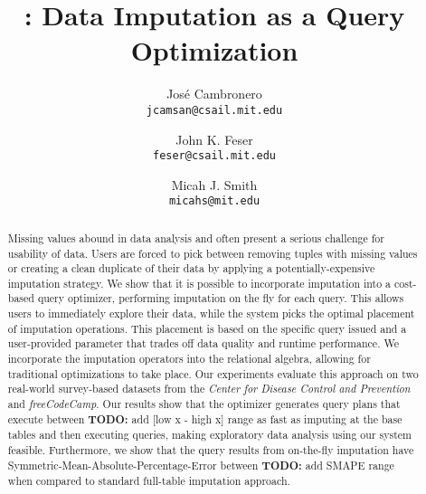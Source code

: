 \documentclass{vldb}
\title{\ProjectName{}: Data Imputation as a Query Optimization}
\author{
  Jos\'e Cambronero \\
  \texttt{jcamsan@csail.mit.edu}
  \and
  John K. Feser \\
  \texttt{feser@csail.mit.edu}
  \and
  Micah J. Smith \\
  \texttt{micahs@mit.edu}}
\newcommand{\todo}[1]{{\color{red}\textbf{TODO:} #1}}
\begin{document}
\maketitle

\begin{abstract}
Missing values abound in data analysis and often present a serious challenge for usability of data. Users
are forced to pick between removing tuples with missing values or creating a clean duplicate of their data
by  applying a potentially-expensive imputation strategy. We show that it is possible
to incorporate imputation into a cost-based query optimizer, performing imputation on the fly
for each query. This allows users to immediately explore
their data, while the system picks the optimal placement of imputation operations. This placement is based
on the specific query issued and a user-provided parameter that trades off data
quality and runtime performance. We incorporate the imputation operators into the relational algebra, allowing
for traditional optimizations to take place. Our experiments evaluate this approach on two real-world survey-based datasets
from the \textit{Center for Disease Control and Prevention} and \textit{freeCodeCamp}. Our results show that the optimizer
generates query plans that execute between \todo{add [low x - high x] range} as fast as imputing at the base
tables and then executing queries, making exploratory data analysis using our system feasible. Furthermore, we show that the query results
from on-the-fly imputation have Symmetric-Mean-Absolute-Percentage-Error between \todo{add SMAPE range}  
when compared to standard full-table imputation approach.
\end{abstract}







\balance
{}
\printbibliography
\end{document}
